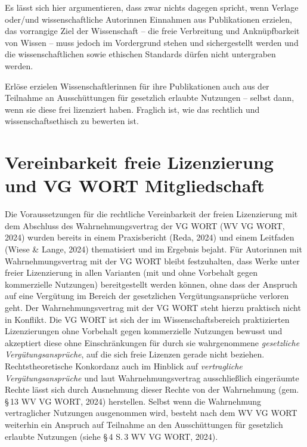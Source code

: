 \documentclass[a4paper,
fontsize=11pt,
oneside,
numbers=noperiodatend,
parskip=half-,
bibliography=totoc,
final
]{scrartcl}
\begin{document}
Es lässt sich hier argumentieren, dass zwar nichts dagegen spricht, wenn
Verlage oder/und wissenschaftliche Autorinnen Einnahmen aus
Publikationen erzielen, das vorrangige Ziel der Wissenschaft -- die
freie Verbreitung und Anknüpfbarkeit von Wissen -- muss jedoch im
Vordergrund stehen und sichergestellt werden und die wissenschaftlichen
sowie ethischen Standards dürfen nicht untergraben werden.

Erlöse erzielen Wissenschaftlerinnen für ihre Publikationen auch aus der
Teilnahme an Ausschüttungen für gesetzlich erlaubte Nutzungen -- selbst
dann, wenn sie diese frei lizenziert haben. Fraglich ist, wie das
rechtlich und wissenschaftsethisch zu bewerten ist.

\section{Vereinbarkeit freie Lizenzierung und VG WORT
Mitgliedschaft}\label{vereinbarkeit-freie-lizenzierung-und-vg-wort-mitgliedschaft}

Die Voraussetzungen für die rechtliche Vereinbarkeit der freien
Lizenzierung mit dem Abschluss des Wahrnehmungsvertrag der VG WORT (WV
VG WORT, 2024) wurden bereits in einem Praxisbericht (Reda, 2024) und
einem Leitfaden (Wiese \& Lange, 2024) thematisiert und im Ergebnis
bejaht. Für Autorinnen mit Wahrnehmungsvertrag mit der VG WORT bleibt
festzuhalten, dass Werke unter freier Lizenzierung in allen Varianten
(mit und ohne Vorbehalt gegen kommerzielle Nutzungen) bereitgestellt
werden können, ohne dass der Anspruch auf eine Vergütung im Bereich der
gesetzlichen Vergütungsansprüche verloren geht. Der Wahrnehmungsvertrag
mit der VG WORT steht hierzu praktisch nicht in Konflikt. Die VG WORT
ist sich der im Wissenschaftsbereich praktizierten Lizenzierungen ohne
Vorbehalt gegen kommerzielle Nutzungen bewusst und akzeptiert diese ohne
Einschränkungen für durch sie wahrgenommene \emph{gesetzliche
Vergütungsansprüche}, auf die sich freie Lizenzen gerade nicht beziehen.
Rechtstheoretische Konkordanz auch im Hinblick auf \emph{vertragliche
Vergütungsansprüche} und laut Wahrnehmungsvertrag ausschließlich
eingeräumte Rechte lässt sich durch Ausnehmung dieser Rechte von der
Wahrnehmung (gem. §\,13 WV VG WORT, 2024) herstellen. Selbst wenn die
Wahrnehmung vertraglicher Nutzungen ausgenommen wird, besteht nach dem
WV VG WORT weiterhin ein Anspruch auf Teilnahme an den Ausschüttungen
für gesetzlich erlaubte Nutzungen (siehe §\,4 S.\,3 WV VG WORT, 2024).
\end{document}
